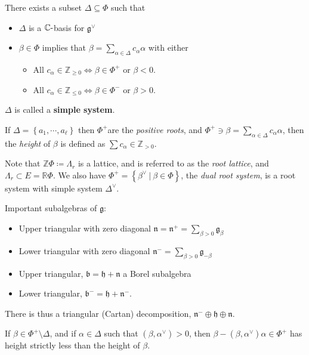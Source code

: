 \documentclass[11pt]{scrartcl}
\theoremstyle{definition}
\theoremstyle{theorem}
\theoremstyle{proof}
\theoremstyle{definition}
\theoremstyle{break}
\theoremstyle{problem}
\providecommand{\tightlist}{%
  \setlength{\itemsep}{0pt}\setlength{\parskip}{0pt}}
\newcommand{\CC}[0]{{\mathbb{C}}}
\newcommand{\RR}[0]{{\mathbb{R}}}
\newcommand{\ZZ}[0]{{\mathbb{Z}}}
\newcommand{\dash}[0]{{\hbox{-}}}
\newcommand{\definedas}[0]{\coloneqq}
\newcommand{\dual}[0]{^\vee}
\newcommand{\lieg}[0]{{\mathfrak{g}}}
\newcommand{\lieh}[0]{{\mathfrak{h}}}
\newcommand{\suchthat}[0]{{~\mathrel{\Big|}~}}
\newcommand{\theset}[1]{\left\{{#1}\right\}}
\begin{document}
There exists a subset \(\Delta \subseteq \Phi\) such that

\begin{itemize}
\tightlist
\item
  \(\Delta\) is a \(\CC\dash\)basis for \(\lieg\dual\)
\item
  \(\beta\in\Phi\) implies that
  \(\beta = \sum_{\alpha \in \Delta} c_\alpha \alpha\) with either

  \begin{itemize}
  \tightlist
  \item
    All \(c_\alpha \in \ZZ_{\geq 0} \iff \beta \in \Phi^+\) or
    \(\beta < 0\).
  \item
    All \(c_\alpha \in \ZZ_{\leq 0} \iff \beta \in \Phi^-\) or
    \(\beta > 0\).
  \end{itemize}
\end{itemize}

\(\Delta\) is called a \textbf{simple system}.

If \(\Delta = \theset{a_1, \cdots, a_\ell}\) then \(\Phi^+\)are the
\emph{positive roots}, and
\(\Phi^+ \ni \beta = \sum_{\alpha \in \Delta} c_\alpha \alpha\), then
the \emph{height} of \(\beta\) is defined as
\(\sum c_\alpha \in \ZZ_{> 0}\).

Note that \(\ZZ \Phi \definedas \Lambda_r\) is a lattice, and is
referred to as the \emph{root lattice}, and
\(\Lambda_r \subset E = \RR \Phi\). We also have
\(\Phi^+ = \theset{\beta\dual \suchthat \beta \in \Phi}\), the
\emph{dual root system}, is a root system with simple system
\(\Delta\dual\).

Important subalgebras of \(\lieg\):

\begin{itemize}
\tightlist
\item
  Upper triangular with zero diagonal
  \(\mathfrak{n} = \mathfrak{n}^+ = \sum_{\beta > 0} \lieg_\beta\)
\item
  Lower triangular with zero diagonal
  \(\mathfrak{n}^- = \sum_{\beta > 0} \lieg_{-\beta}\)
\item
  Upper triangular, \(\mathfrak b = \lieh + \mathfrak n\) a Borel
  subalgebra
\item
  Lower triangular, \(\mathfrak{b}^- = \lieh + \mathfrak{n}^-\).
\end{itemize}

There is thus a triangular (Cartan) decomposition,
\(\mathfrak{n}^- \oplus \lieh \oplus \mathfrak n\).

\begin{description}
\tightlist
\item[Fact]
If \(\beta \in \Phi^+\setminus \Delta\), and if \(\alpha \in \Delta\)
such that \((\beta, \alpha\dual) > 0\), then
\(\beta - (\beta,\alpha\dual)\alpha \in \Phi^+\) has height strictly
less than the height of \(\beta\).
\end{description}
\end{document}
